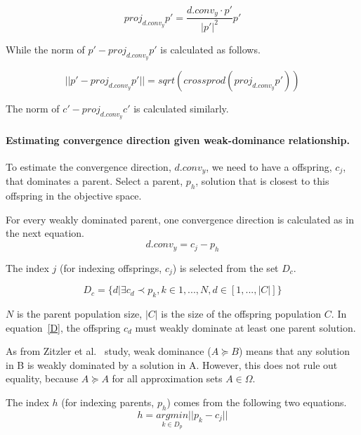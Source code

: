 \documentclass{IEEEtran}
\begin{document}
\begin{equation}
proj_{d.conv_{y}}p \prime = \frac {{d.conv_{y}} \cdot {p \prime}} {|{p \prime}|^2}{{p \prime}} 
\end{equation}

While the norm of $p \prime - proj_{d.conv_{y}}p \prime$ is calculated as follows.


\begin{equation}
||p \prime - proj_{d.conv_{y}}p \prime|| = sqrt(crossprod(proj_{d.conv_{y}}p \prime))
\end{equation}

The norm of $c \prime - proj_{d.conv_{y}}c \prime$ is calculated similarly.



\paragraph{Estimating convergence direction given weak-dominance relationship.}To estimate the convergence direction, $d.conv_{y}$, we need to have a offspring, $c_j$, that dominates a parent. Select a parent, $p_h$, solution that is closest to this offspring in the objective space. 

For every weakly dominated parent, one convergence direction is calculated as in the next equation.
\begin{equation}
\label{1}
	d.conv_{y} = c_j - p_h
\end{equation}

The index $j$ (for indexing offsprings, $c_j$) is selected from the set $D_c$.

\begin{equation}
\label{D}
	D_c = \{d| \exists c_d \prec p_k, k \in {1,..., N}, d \in [1,..., |C|]\}
\end{equation}

$N$ is the parent population size, $|C|$ is the size of the offspring population $C$. In equation~\ref{D}, the offspring $c_d$ must weakly dominate at least one parent solution. 

As from Zitzler et al.~\cite{zitzler2003performance} study, weak dominance ($A \succeq B$) means that any solution in B is weakly dominated by a solution in A. However, this does not rule out equality, because $A \succeq A$ for all approximation sets $A \in \Omega$.

The index $h$ (for indexing parents, $p_h$) comes from the following two equations.
\begin{equation}
h = \underset{k \in D_p }{argmin} || p_k - c_j ||
\end{equation}
\end{document}
